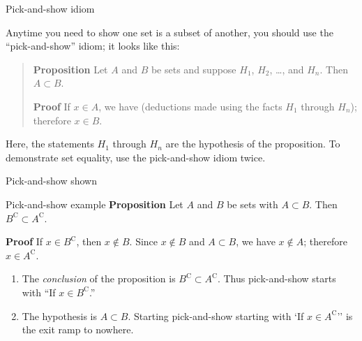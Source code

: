 \documentclass[professionalfonts]{beamer}%
\newenvironment{handlist}{
  \begin{enumerate}[\leftthumbsup]
    \addtolength{\itemsep}{-0.3\itemsep}}
  {\end{enumerate}}
\begin{document}
\begin{frame}[fragile]{Pick-and-show idiom}{}%

Anytime you need to show one set is a subset of another, you should use the
``pick-and-show'' idiom; it looks like this:

\begin{quote}

{\bf Proposition} Let \(A\) and \(B\) be sets and suppose \(H_1\), \(H_2\), \dots , and \(H_n\). Then  \(A \subset B\).

\vspace{0.1in}

{\bf Proof} If \(x \in A\), we have (deductions made using the 
facts \(H_1\) through \(H_n\)); therefore \(x \in B\).

\end{quote}
Here, the statements \(H_1\) through \(H_n\) are the hypothesis of the
proposition. To demonstrate set equality, use the pick-and-show idiom twice. 

\end{frame}

\begin{frame}[fragile]{Pick-and-show shown}{}%

\begin{block}{Pick-and-show example}
\textbf{Proposition} Let \(A\) and \(B\) be sets with \(A \subset B\). Then \(B^\mathrm{C} \subset A^\mathrm{C}\).

\vspace{0.1in}

\textbf{Proof} If \(x \in B^\mathrm{C} \), then \(x \notin B\). Since \(x \notin B\) and  \(A \subset B\), we have \(x \notin A\); therefore
\(x \in A^\mathrm{C}\).

\end{block}

\begin{handlist}

\item The \emph{conclusion} of the proposition is  \(B^\mathrm{C} \subset A^\mathrm{C}\). Thus pick-and-show starts with ``If \(x \in B^\mathrm{C}\).''

\item The hypothesis is  \(A \subset B\). Starting pick-and-show starting with `If \(x \in A^\mathrm{C}\)'' is the exit ramp to nowhere.

\end{handlist}

\end{frame}
\end{document}
